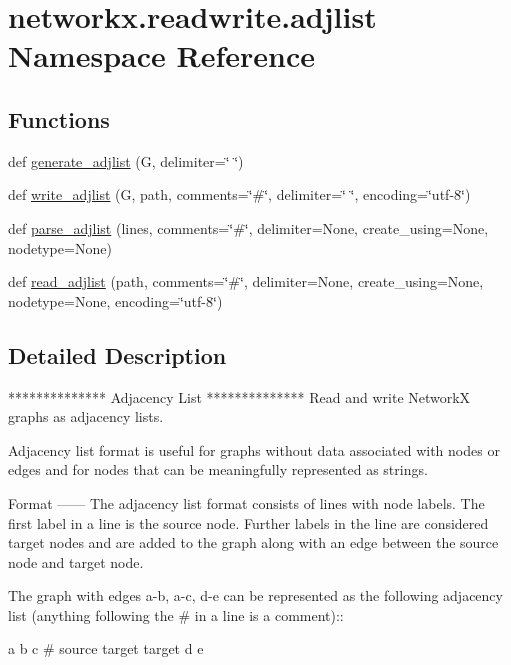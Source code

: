 \hypertarget{namespacenetworkx_1_1readwrite_1_1adjlist}{}\section{networkx.\+readwrite.\+adjlist Namespace Reference}
\label{namespacenetworkx_1_1readwrite_1_1adjlist}
\subsection*{Functions}
\begin{DoxyCompactItemize}
\item 
def \hyperlink{namespacenetworkx_1_1readwrite_1_1adjlist_ad968491cea6745e67b193d867b43e641}{generate\+\_\+adjlist} (G, delimiter=\char`\"{} \char`\"{})
\item 
def \hyperlink{namespacenetworkx_1_1readwrite_1_1adjlist_a924db60cfb8b93c123c4c1be8a09bf68}{write\+\_\+adjlist} (G, path, comments=\char`\"{}\#\char`\"{}, delimiter=\char`\"{} \char`\"{}, encoding=\char`\"{}utf-\/8\char`\"{})
\item 
def \hyperlink{namespacenetworkx_1_1readwrite_1_1adjlist_a888a7fcfbd0047df237d86dbd2bdd36a}{parse\+\_\+adjlist} (lines, comments=\char`\"{}\#\char`\"{}, delimiter=None, create\+\_\+using=None, nodetype=None)
\item 
def \hyperlink{namespacenetworkx_1_1readwrite_1_1adjlist_a91901f189945f9fd9ea8d435440079ce}{read\+\_\+adjlist} (path, comments=\char`\"{}\#\char`\"{}, delimiter=None, create\+\_\+using=None, nodetype=None, encoding=\char`\"{}utf-\/8\char`\"{})
\end{DoxyCompactItemize}


\subsection{Detailed Description}
\begin{DoxyVerb}**************
Adjacency List
**************
Read and write NetworkX graphs as adjacency lists.

Adjacency list format is useful for graphs without data associated
with nodes or edges and for nodes that can be meaningfully represented
as strings.

Format
------
The adjacency list format consists of lines with node labels.  The
first label in a line is the source node.  Further labels in the line
are considered target nodes and are added to the graph along with an edge
between the source node and target node.

The graph with edges a-b, a-c, d-e can be represented as the following
adjacency list (anything following the # in a line is a comment)::

     a b c # source target target
     d e
\end{DoxyVerb}
 

